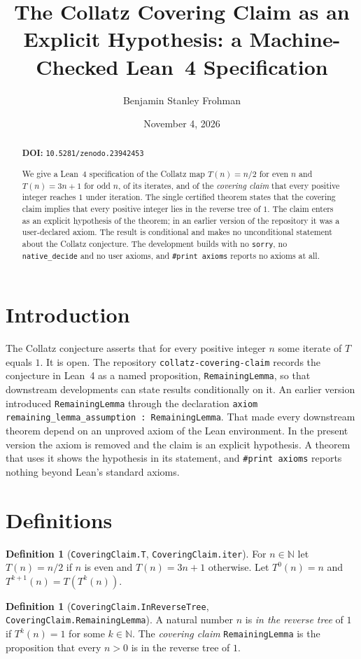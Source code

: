 \documentclass[11pt]{amsart}
\title[collatz-covering-claim]{The Collatz Covering Claim as an Explicit Hypothesis: a Machine-Checked Lean~4 Specification}
\author{Benjamin Stanley Frohman}
\date{November 4, 2026}
\theoremstyle{definition}
\newtheorem{definition}[theorem]{Definition}
\theoremstyle{remark}
\begin{document}
\begin{abstract}
\noindent\textbf{DOI:} \texttt{10.5281/zenodo.23942453}\par\smallskip

We give a Lean~4 specification of the Collatz map $T(n)=n/2$ for even $n$ and $T(n)=3n+1$ for odd $n$, of its iterates, and of the \emph{covering claim} that every positive integer reaches $1$ under iteration. The single certified theorem states that the covering claim implies that every positive integer lies in the reverse tree of $1$. The claim enters as an explicit hypothesis of the theorem; in an earlier version of the repository it was a user-declared axiom. The result is conditional and makes no unconditional statement about the Collatz conjecture. The development builds with no \texttt{sorry}, no \texttt{native\_decide} and no user axioms, and \texttt{\#print axioms} reports no axioms at all.
\end{abstract}
\maketitle

\section{Introduction}
The Collatz conjecture asserts that for every positive integer $n$ some iterate of $T$ equals $1$. It is open. The repository \texttt{collatz-covering-claim} records the conjecture in Lean~4 as a named proposition, \texttt{RemainingLemma}, so that downstream developments can state results conditionally on it. An earlier version introduced \texttt{RemainingLemma} through the declaration \texttt{axiom remaining\_lemma\_assumption : RemainingLemma}. That made every downstream theorem depend on an unproved axiom of the Lean environment. In the present version the axiom is removed and the claim is an explicit hypothesis. A theorem that uses it shows the hypothesis in its statement, and \texttt{\#print axioms} reports nothing beyond Lean's standard axioms.

\section{Definitions}
\begin{definition}[\texttt{CoveringClaim.T}, \texttt{CoveringClaim.iter}]
For $n\in\mathbb N$ let $T(n)=n/2$ if $n$ is even and $T(n)=3n+1$ otherwise. Let $T^0(n)=n$ and $T^{k+1}(n)=T(T^k(n))$.
\end{definition}
\begin{definition}[\texttt{CoveringClaim.InReverseTree}, \texttt{CoveringClaim.RemainingLemma}]
A natural number $n$ is \emph{in the reverse tree} of $1$ if $T^k(n)=1$ for some $k\in\mathbb N$. The \emph{covering claim} \texttt{RemainingLemma} is the proposition that every $n>0$ is in the reverse tree of $1$.
\end{definition}
\end{document}
